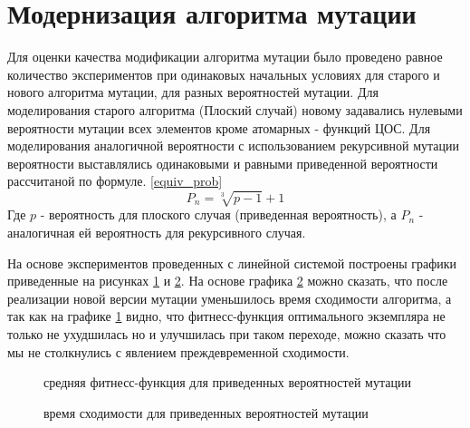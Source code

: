 \documentclass[utf8,usehyperref,12pt]{G7-32}
\begin{document}
\section{Модернизация алгоритма мутации}
Для оценки качества модификации алгоритма мутации было проведено равное количество экспериментов при одинаковых начальных условиях для старого и нового алгоритма мутации, для разных вероятностей мутации. Для моделирования старого алгоритма (Плоский случай) новому задавались нулевыми вероятности мутации всех элементов кроме атомарных - функций ЦОС. Для моделирования аналогичной вероятности с использованием рекурсивной мутации вероятности выставлялись одинаковыми и равными приведенной вероятности рассчитаной по формуле. \ref{equiv_prob}
\begin{equation}
P_{n}=\sqrt[3]{p-1}+1
\label{equiv_prob}
\end{equation}
Где $ p $ - вероятность для плоского случая (приведенная вероятность), а $ P_{n} $ - аналогичная ей вероятность для рекурсивного случая.

На основе экспериментов проведенных с линейной системой построены графики приведенные на рисунках \ref{mutate_diff_fit} и \ref{mutate_diff_gen}. На основе графика  \ref{mutate_diff_gen} можно сказать, что после реализации новой версии мутации уменьшилось время сходимости алгоритма, а так как на графике \ref{mutate_diff_fit} видно, что фитнесс-функция оптимального экземпляра не только не ухудшилась но и улучшилась при таком переходе, можно сказать что мы не столкнулись с явлением преждевременной сходимости.
\begin{figure}[H]
 \caption{средняя фитнесс-функция для приведенных вероятностей мутации}\label{mutate_diff_fit}
\end{figure}
\begin{figure}[H]
 \caption{время сходимости для приведенных вероятностей мутации}\label{mutate_diff_gen}
\end{figure}
\end{document}
